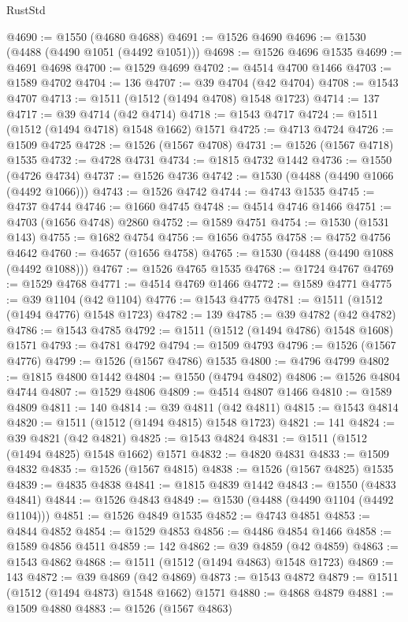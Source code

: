 \begin{lexlean}{RustStd}
\begin{coremodule}
{{@4690 := @1550 (@4680 @4688)
@4691 := @1526 @4690
@4696 := @1530 (@4488 (@4490 @1051 (@4492 @1051)))
@4698 := @1526 @4696 @1535
@4699 := @4691 @4698
@4700 := @1529 @4699
@4702 := @4514 @4700 @1466
@4703 := @1589 @4702
@4704 := 136
@4707 := @39 @4704 (@42 @4704)
@4708 := @1543 @4707
@4713 := @1511 (@1512 (@1494 @4708) @1548 @1723)
@4714 := 137
@4717 := @39 @4714 (@42 @4714)
@4718 := @1543 @4717
@4724 := @1511 (@1512 (@1494 @4718) @1548 @1662) @1571
@4725 := @4713 @4724
@4726 := @1509 @4725
@4728 := @1526 (@1567 @4708)
@4731 := @1526 (@1567 @4718) @1535
@4732 := @4728 @4731
@4734 := @1815 @4732 @1442
@4736 := @1550 (@4726 @4734)
@4737 := @1526 @4736
@4742 := @1530 (@4488 (@4490 @1066 (@4492 @1066)))
@4743 := @1526 @4742
@4744 := @4743 @1535
@4745 := @4737 @4744
@4746 := @1660 @4745
@4748 := @4514 @4746 @1466
@4751 := @4703 (@1656 @4748) @2860
@4752 := @1589 @4751
@4754 := @1530 (@1531 @143)
@4755 := @1682 @4754
@4756 := @1656 @4755
@4758 := @4752 @4756 @4642
@4760 := @4657 (@1656 @4758)
@4765 := @1530 (@4488 (@4490 @1088 (@4492 @1088)))
@4767 := @1526 @4765 @1535
@4768 := @1724 @4767
@4769 := @1529 @4768
@4771 := @4514 @4769 @1466
@4772 := @1589 @4771
@4775 := @39 @1104 (@42 @1104)
@4776 := @1543 @4775
@4781 := @1511 (@1512 (@1494 @4776) @1548 @1723)
@4782 := 139
@4785 := @39 @4782 (@42 @4782)
@4786 := @1543 @4785
@4792 := @1511 (@1512 (@1494 @4786) @1548 @1608) @1571
@4793 := @4781 @4792
@4794 := @1509 @4793
@4796 := @1526 (@1567 @4776)
@4799 := @1526 (@1567 @4786) @1535
@4800 := @4796 @4799
@4802 := @1815 @4800 @1442
@4804 := @1550 (@4794 @4802)
@4806 := @1526 @4804 @4744
@4807 := @1529 @4806
@4809 := @4514 @4807 @1466
@4810 := @1589 @4809
@4811 := 140
@4814 := @39 @4811 (@42 @4811)
@4815 := @1543 @4814
@4820 := @1511 (@1512 (@1494 @4815) @1548 @1723)
@4821 := 141
@4824 := @39 @4821 (@42 @4821)
@4825 := @1543 @4824
@4831 := @1511 (@1512 (@1494 @4825) @1548 @1662) @1571
@4832 := @4820 @4831
@4833 := @1509 @4832
@4835 := @1526 (@1567 @4815)
@4838 := @1526 (@1567 @4825) @1535
@4839 := @4835 @4838
@4841 := @1815 @4839 @1442
@4843 := @1550 (@4833 @4841)
@4844 := @1526 @4843
@4849 := @1530 (@4488 (@4490 @1104 (@4492 @1104)))
@4851 := @1526 @4849 @1535
@4852 := @4743 @4851
@4853 := @4844 @4852
@4854 := @1529 @4853
@4856 := @4486 @4854 @1466
@4858 := @1589 @4856 @4511
@4859 := 142
@4862 := @39 @4859 (@42 @4859)
@4863 := @1543 @4862
@4868 := @1511 (@1512 (@1494 @4863) @1548 @1723)
@4869 := 143
@4872 := @39 @4869 (@42 @4869)
@4873 := @1543 @4872
@4879 := @1511 (@1512 (@1494 @4873) @1548 @1662) @1571
@4880 := @4868 @4879
@4881 := @1509 @4880
@4883 := @1526 (@1567 @4863)
}}
\end{coremodule}
\end{lexlean}

